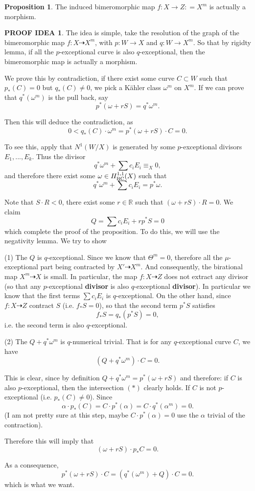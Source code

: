 \documentclass[11pt]{article}
\theoremstyle{definition}
\newtheorem{proposition}[theorem]{Proposition}
\newtheorem{proofidea}[theorem]{PROOF IDEA}
\begin{document}
	\begin{proposition}
		The induced bimeromorphic map $f:X \to Z: =X^m $ is actually a morphism.
	\end{proposition}
	\begin{proofidea}
		The idea is simple, take the resolution of the graph of the bimeromorphic map $f: X \dashrightarrow X^m$, with $p:W\to X$ and $q:W\to X^m$. So that by rigidty lemma, if all the $p$-exceptional curve is also $q$-exceptional, then the bimeromorphic map is actually a morphism. 
		
		We prove this by contradiction, if there exist some curve $C \subset W$ such that $p_* (C) = 0$ but $q_* (C) \ne 0$, we pick a K\"ahler class $\omega^m$ on $X^m$. If we can prove that $q^* (\omega^m)$ is the pull back, say $$p^*(\omega + rS) = q^* \omega^m.$$ 
		
		Then this will deduce the contradiction, as $$0<q_*(C) \cdot \omega^m  = p^*(\omega+ rS) \cdot C = 0.$$
		
		To see this, apply that $N^1(W/X)$ is generated by some $p$-exceptional divisors $E_1, ... , E_k$. Thus the divisor $$q^* \omega ^m  + \sum c_i E_i \equiv_X 0,$$and therefore there exist some $\omega \in H^{1,1}_{\rm{BC}}(X)$ such that $$q^* \omega^m + \sum c_i E_i = p^* \omega.$$ 
		
		Note that $S \cdot R < 0$, there exist some $r\in \mathbb{R}$ such that $(\omega + rS)\cdot R = 0$. We claim $$Q = \sum c_i E_i + r p^* S =0$$ which complete the proof of the proposition. To do this, we will use the negativity lemma. We try to show
		
		(1) The $Q$ is $q$-exceptional. Since we know that $\Theta^m = 0$, therefore all the $\mu$-exceptional part being contracted by $X' \dashrightarrow X^m$. And consequently, the birational map $X^m \dashrightarrow X$ is small. In particular, the map $f:X \dashrightarrow Z$ does not extract any divisor (so that any $p$-exceptional \textbf{divisor} is also $q$-exceptional \textbf{divisor}). In particular we know that the first terms $\sum c_i E_i$ is $q$-exceptional. On the other hand, since $f: X \dashrightarrow Z$ contract $S$ (i.e. $f_* S = 0$), so that the second term $p^*S$ satisfies $$f_* S = q_* (p^* S) = 0,$$i.e. the second term is also $q$-exceptional.
		
		(2) The $Q + q^* \omega^m$ is $q$-numerical trivial. That is for any $q$-exceptional curve $C$, we have $$(Q+ q^* \omega^m )\cdot C = 0.$$
		
		This is clear, since by definition $Q+ q^* \omega ^m  = p^* (\omega + r S)$ and therefore: if $C$ is also $p$-exceptional, then the intersection $(*)$ clearly holds. If $C$ is not $p$-exceptional (i.e. $p_*(C) \ne 0$). Since $$\alpha \cdot p_* (C) = C \cdot p^*(\alpha) = C \cdot q^*(\alpha^m) = 0.$$
		(I am not pretty sure at this step, maybe $C \cdot p^*(\alpha) = 0$ use the $\alpha$ trivial of the contraction).
		
		Therefore this will imply that $$(\omega + rS) \cdot p_* C = 0.$$
		
		As a consequence, $$p^*(\omega + rS) \cdot C = (q^*(\omega^m)+ Q) \cdot C = 0.$$which is what we want.
		
		
	\end{proofidea}
	
\end{document}
